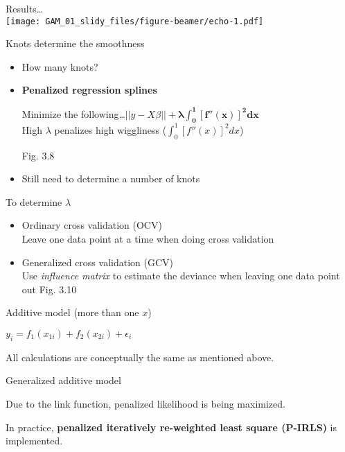 \documentclass[14 pt,ignorenonframetext,]{beamer}
\begin{document}
\begin{frame}{}
\protect\hypertarget{section-1}{}

Results\ldots{}\\
\texttt{[image: GAM\_01\_slidy\_files/figure-beamer/echo-1.pdf]}

\end{frame}

\begin{frame}{Knots determine the smoothness}
\protect\hypertarget{knots-determine-the-smoothness}{}

\begin{itemize}
\item
  How many knots?
\item
  \textbf{Penalized regression splines}

  Minimize the
  following\ldots{}\(||y - X\beta|| + \boldsymbol{\lambda \int_{0}^{1}[f''(x)]^2dx}\)\\

  High \(\lambda\) penalizes high wiggliness
  (\(\int_{0}^{1}[f''(x)]^2dx\))

  Fig. 3.8
\item
  Still need to determine a number of knots
\end{itemize}

\end{frame}

\begin{frame}{To determine \(\lambda\)}
\protect\hypertarget{to-determine-lambda}{}

\begin{itemize}
\item
  Ordinary cross validation (OCV)\\
  Leave one data point at a time when doing cross validation
\item
  Generalized cross validation (GCV)\\
  Use \emph{influence matrix} to estimate the deviance when leaving one
  data point out Fig. 3.10
\end{itemize}

\end{frame}

\begin{frame}{Additive model (more than one \(x\))}
\protect\hypertarget{additive-model-more-than-one-x}{}

\(y_i = f_1(x_{1i}) + f_2(x_{2i}) + \epsilon_i\)

All calculations are conceptually the same as mentioned above.

\end{frame}

\begin{frame}{Generalized additive model}
\protect\hypertarget{generalized-additive-model}{}

Due to the link function, penalized likelihood is being maximized.

In practice, \textbf{penalized iteratively re-weighted least square
(P-IRLS)} is implemented.

\end{frame}
\end{document}
